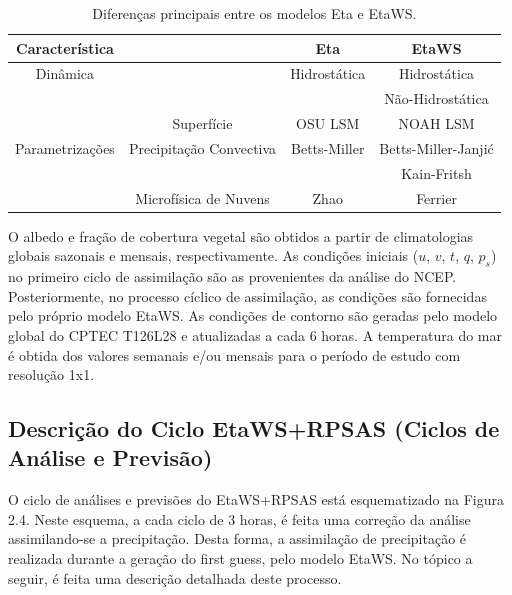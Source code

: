 \begin{table}[ht]
\caption{Diferenças principais entre os modelos Eta e EtaWS.}
\label{tab01}
\centering
\begin{tabular}{c|c|c|c}
\hline
Característica      &                                 & Eta               & EtaWS                    \\
\hline
Dinâmica            &                                 & Hidrostática  & Hidrostática         \\
                        &                                 &                   & Não-Hidrostática \\
                        & Superfície                  & OSU LSM           & NOAH LSM                 \\
Parametrizações & Precipitação Convectiva & Betts-Miller      & Betts-Miller-Janji\'{c}  \\
                        &                                 &                   & Kain-Fritsh              \\
                        & Microfísica de Nuvens       & Zhao              & Ferrier                  \\
\hline
\end{tabular}
\end{table}

O albedo e fração de cobertura vegetal são obtidos a partir de climatologias globais sazonais e mensais, respectivamente. As condições iniciais ($u$, $v$, $t$, $q$, $p_{s}$) no primeiro ciclo de assimilação são as provenientes da análise do NCEP. Posteriormente, no processo cíclico de assimilação, as condições são fornecidas pelo próprio modelo EtaWS. As condições de contorno são geradas pelo modelo global do CPTEC T126L28 e atualizadas a cada 6 horas. A temperatura do mar é obtida dos valores semanais e/ou mensais para o período de estudo com resolução 1x1.

\subsection{Descrição do Ciclo EtaWS+RPSAS (Ciclos de Análise e Previsão)}

O ciclo de análises e previsões do EtaWS+RPSAS está esquematizado na Figura 2.4. Neste esquema, a cada ciclo de 3 horas, é feita uma correção da análise assimilando-se a precipitação. Desta forma, a assimilação de precipitação é realizada durante a geração do first guess, pelo modelo EtaWS. No tópico a seguir, é feita uma descrição detalhada deste processo.

